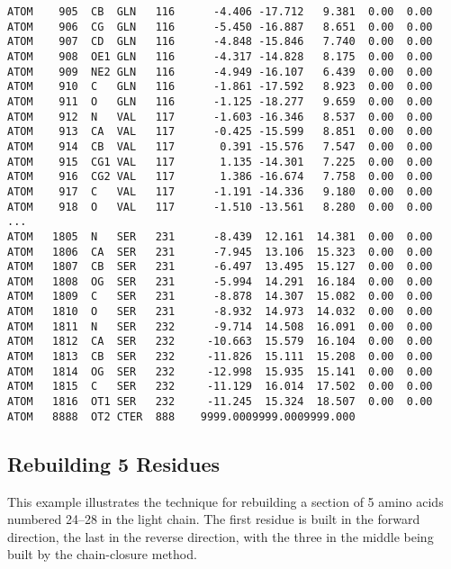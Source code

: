 \begin{verbatim}
ATOM    905  CB  GLN   116      -4.406 -17.712   9.381  0.00  0.00
ATOM    906  CG  GLN   116      -5.450 -16.887   8.651  0.00  0.00
ATOM    907  CD  GLN   116      -4.848 -15.846   7.740  0.00  0.00
ATOM    908  OE1 GLN   116      -4.317 -14.828   8.175  0.00  0.00
ATOM    909  NE2 GLN   116      -4.949 -16.107   6.439  0.00  0.00
ATOM    910  C   GLN   116      -1.861 -17.592   8.923  0.00  0.00
ATOM    911  O   GLN   116      -1.125 -18.277   9.659  0.00  0.00
ATOM    912  N   VAL   117      -1.603 -16.346   8.537  0.00  0.00
ATOM    913  CA  VAL   117      -0.425 -15.599   8.851  0.00  0.00
ATOM    914  CB  VAL   117       0.391 -15.576   7.547  0.00  0.00
ATOM    915  CG1 VAL   117       1.135 -14.301   7.225  0.00  0.00
ATOM    916  CG2 VAL   117       1.386 -16.674   7.758  0.00  0.00
ATOM    917  C   VAL   117      -1.191 -14.336   9.180  0.00  0.00
ATOM    918  O   VAL   117      -1.510 -13.561   8.280  0.00  0.00
...
ATOM   1805  N   SER   231      -8.439  12.161  14.381  0.00  0.00
ATOM   1806  CA  SER   231      -7.945  13.106  15.323  0.00  0.00
ATOM   1807  CB  SER   231      -6.497  13.495  15.127  0.00  0.00
ATOM   1808  OG  SER   231      -5.994  14.291  16.184  0.00  0.00
ATOM   1809  C   SER   231      -8.878  14.307  15.082  0.00  0.00
ATOM   1810  O   SER   231      -8.932  14.973  14.032  0.00  0.00
ATOM   1811  N   SER   232      -9.714  14.508  16.091  0.00  0.00
ATOM   1812  CA  SER   232     -10.663  15.579  16.104  0.00  0.00
ATOM   1813  CB  SER   232     -11.826  15.111  15.208  0.00  0.00
ATOM   1814  OG  SER   232     -12.998  15.935  15.141  0.00  0.00
ATOM   1815  C   SER   232     -11.129  16.014  17.502  0.00  0.00
ATOM   1816  OT1 SER   232     -11.245  15.324  18.507  0.00  0.00
ATOM   8888  OT2 CTER  888    9999.0009999.0009999.000
\end{verbatim}

\subsection{Rebuilding 5 Residues}
This example illustrates the technique for rebuilding a section of 
5 amino acids numbered 24--28 in the light chain. The first residue is 
built in the forward direction,
the last in the reverse direction, with the three in the middle
being built by the chain-closure method.

